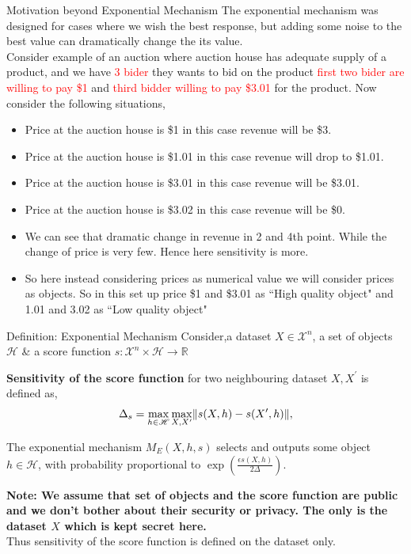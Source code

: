 \documentclass[aspectratio=169]{beamer}
\newcommand{\tcr}{\textcolor{red}}
\DeclarePairedDelimiter{\norm}{\lVert}{\rVert}
\begin{document}
\begin{frame}{Motivation beyond Exponential Mechanism}
The exponential mechanism was designed for cases where we wish the best response, but adding some noise to the best value can dramatically change the its value.\\
Consider example of an auction where auction house has adequate supply of a product, and we have \tcr{3 bider} they wants to bid on the product \tcr{first two bider are willing to pay \$1} and \tcr{third bidder willing to pay \$3.01} for the product. Now consider the following situations,
\begin{itemize}
\item
Price at the auction house is \$1 in this case revenue will be \$3.
\item
Price at the auction house is \$1.01 in this case revenue will drop to \$1.01.
\item
Price at the auction house is \$3.01 in this case revenue will be \$3.01.
\item
Price at the auction house is \$3.02 in this case revenue will be \$0.
\item
We can see that dramatic change in revenue in 2 and 4th point. While the change of price is very few. Hence here sensitivity is more.
\item
So here instead considering prices as numerical value we will consider prices as objects. So in this set up price \$1 and \$3.01 as ``High quality object" and 1.01 and 3.02 as ``Low quality object"
\end{itemize} 
\end{frame}

\begin{frame}{Definition: Exponential Mechanism}
Consider,a dataset $X \in \mathscr{X}^n$, a set of objects $\mathscr{H}$ \& a score function $s:\mathscr{X}^n \times \mathscr{H} \rightarrow \mathbb{R}$


\begin{definition}
\textbf{Sensitivity of the score function} for two neighbouring dataset $X, X^\prime$ is defined as,
$$\Delta_s = \max_{h \in \mathscr{H}} \max_{X, X^\prime} \norm{s(X,h)-s(X^\prime,h)},$$ 
\end{definition}

\begin{definition}
The exponential mechanism $M_E(X,h,s)$ selects and outputs some object $h \in \mathscr{H}$, with probability proportional to $\exp(\frac{\epsilon s(X,h)}{2\Delta})$.
\end{definition}

\textbf{Note: We assume that set of objects and the score function are public and we don't bother about their security or privacy. The only is the dataset $X$ which is kept secret here.}\\
Thus sensitivity of the score function is defined on the dataset only.
\end{frame}
\end{document}
